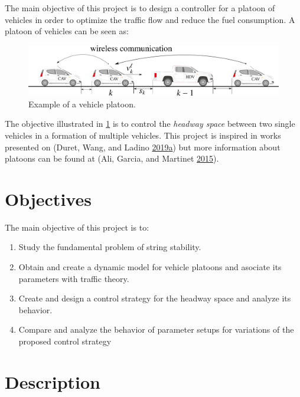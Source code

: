 \documentclass[]{book}
\providecommand{\tightlist}{%
  \setlength{\itemsep}{0pt}\setlength{\parskip}{0pt}}
\theoremstyle{definition}
\theoremstyle{definition}
\theoremstyle{definition}
\theoremstyle{remark}
\begin{document}
The main objective of this project is to design a controller for a
platoon of vehicles in order to optimize the traffic flow and reduce the
fuel consumption. A platoon of vehicles can be seen as:



\begin{figure}

{\centering \includegraphics{images/p2-cavs} 

}

\caption{Example of a vehicle platoon.}\label{fig:cav}
\end{figure}

The objective illustrated in \ref{fig:cav} is to control the
\emph{headway space} between two single vehicles in a formation of
multiple vehicles. This project is inspired in works presented on
(Duret, Wang, and Ladino
\protect\hyperlink{ref-Duret2019:ISTTT}{2019}\protect\hyperlink{ref-Duret2019:ISTTT}{a})
but more information about platoons can be found at (Ali, Garcia, and
Martinet \protect\hyperlink{ref-Ali2015:ITSM}{2015}).

\hypertarget{objectives-1}{%
\section*{Objectives}\label{objectives-1}}

The main objective of this project is to:

\begin{enumerate}
\def\labelenumi{\arabic{enumi}.}
\tightlist
\item
  Study the fundamental problem of string stability.
\item
  Obtain and create a dynamic model for vehicle platoons and asociate
  its parameters with traffic theory.
\item
  Create and design a control strategy for the headway space and analyze
  its behavior.
\item
  Compare and analyze the behavior of parameter setups for variations of
  the proposed control strategy
\end{enumerate}

\hypertarget{description-1}{%
\section*{Description}\label{description-1}}
\end{document}
